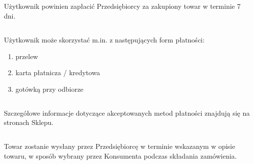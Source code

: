 
		\subsection{} Użytkownik powinien zapłacić Przedsiębiorcy za zakupiony towar w terminie 7 dni.

		\subsection{} Użytkownik może skorzystać m.in. z następujących form płatności:
			\begin{enumerate}[label=(\alph*)]
				\item przelew
				\item karta płatnicza / kredytowa
				\item gotówką przy odbiorze
			\end{enumerate}
		
		\subsection{} Szczegółowe informacje dotyczące akceptowanych metod płatności znajdują się na stronach Sklepu.
			\subsection{} Towar zostanie wysłany przez Przedsiębiorcę w terminie wskazanym w opisie towaru, w sposób wybrany przez Konsumenta podczas składania zamówienia. 
